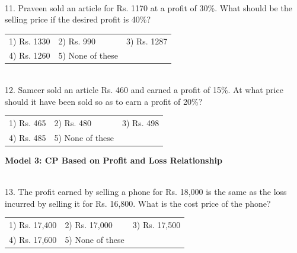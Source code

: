 \documentclass{article}
\begin{document}
	
	
	\noindent 
	
	\noindent  \\ 11. Praveen sold an article for Rs. 1170 at a profit of 30\%. What should be the selling price if the desired profit is 40\%?
	
	\noindent 
	\begin{tabular}{p{1.7in} p{1.6in} p{1.6in}} \\ 
 1) Rs. 1330                 & 2) Rs. 990            & 3) Rs. 1287          \\
4) Rs. 1260          & 5) None of these \\
\end{tabular}
	
	\noindent 
	
	\noindent 
	
	\noindent 
	
	\noindent  \\ 12. Sameer sold an article Rs. 460 and earned a profit of 15\%. At what price should it have been sold so as to earn a profit of 20\%?
	
	\noindent 
	\begin{tabular}{p{1.7in} p{1.6in} p{1.6in}} \\ 
 1) Rs. 465                   & 2) Rs. 480            & 3) Rs. 498            \\
4) Rs. 485            & 5) None of these \\
\end{tabular}
	
	\noindent 
	
	\noindent 
	
	\noindent 
	
	\noindent \textbf{Model 3: CP Based on Profit and Loss Relationship}
	
	\noindent 
	
	\noindent  \\ 13. The profit earned by selling a phone for Rs. 18,000 is the same as the loss incurred by selling it for Rs. 16,800. What is the cost price of the phone?
	
	\noindent 
	\begin{tabular}{p{1.7in} p{1.6in} p{1.6in}} \\ 
 1) Rs. 17,400              & 2) Rs. 17,000       & 3) Rs. 17,500       \\
4) Rs. 17,600       & 5) None of these \\
\end{tabular}
	
\end{document}
